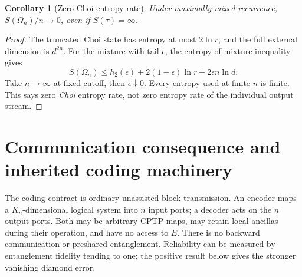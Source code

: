 \documentclass[11pt]{article}
\newtheorem{corollary}[theorem]{Corollary}
\theoremstyle{definition}\newtheorem{definition}[theorem]{Definition}
\begin{document}
\begin{corollary}[Zero Choi entropy rate]
Under maximally mixed recurrence, $S(\Omega_n)/n\to0$, even if $S(\tau)=\infty$.
\end{corollary}
\begin{proof}
The truncated Choi state has entropy at most $2\ln r$, and the full external dimension is $d^{2n}$. For the mixture with tail $\epsilon$, the entropy-of-mixture inequality gives
\[
 S(\Omega_n)\le h_2(\epsilon)+2(1-\epsilon)\ln r+2\epsilon n\ln d.
\]
Take $n\to\infty$ at fixed cutoff, then $\epsilon\downarrow0$. Every entropy used at finite $n$ is finite. This says zero \emph{Choi} entropy rate, not zero entropy rate of the individual output stream.
\end{proof}

\section{Communication consequence and inherited coding machinery}

The coding contract is ordinary unassisted block transmission. An encoder maps a $K_n$-dimensional logical system into $n$ input ports; a decoder acts on the $n$ output ports. Both may be arbitrary CPTP maps, may retain local ancillas during their operation, and have no access to $E$. There is no backward communication or preshared entanglement. Reliability can be measured by entanglement fidelity tending to one; the positive result below gives the stronger vanishing diamond error.
\end{document}
